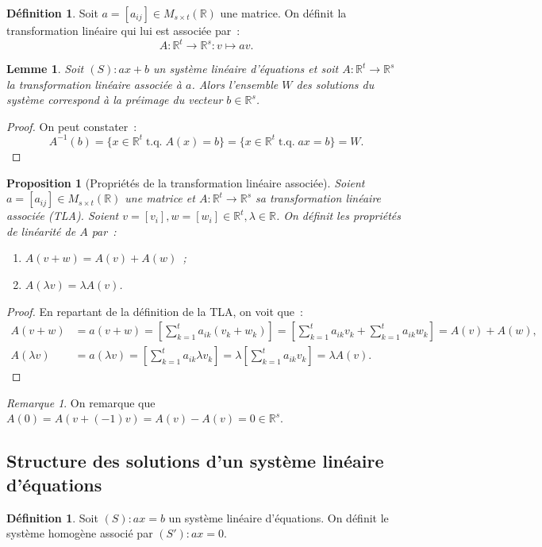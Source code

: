 \documentclass{article}
\DeclareMathOperator{\tq}{\text{ t.q. }}
\newcommand{\R}{\mathbb R}
\newcommand{\M}[3]{M_{#1 \times #2}(#3)}
\newtheorem{prp}[thm]{Proposition}
\newtheorem{lem}[thm]{Lemme}
\theoremstyle{definition}
\newtheorem{déf}[thm]{Définition}
\theoremstyle{remark}
\newtheorem*{rmq}{Remarque}
\begin{document}
		\begin{déf} Soit $a = [a_{ij}] \in \M st\R$ une matrice. On définit la transformation linéaire qui lui est associée par~:
		\[A : \R^t \to \R^s : v \mapsto av.\] \end{déf}

		\begin{lem} Soit $(S) : ax + b$ un système linéaire d'équations et soit $A : \R^t \to \R^s$ la transformation linéaire associée à $a$. Alors l'ensemble $W$ des
		solutions du système correspond à la préimage du vecteur $b \in \R^s$. \end{lem}
		
		\begin{proof} On peut constater~: \[A^{-1}(b) = \{x \in \R^t \tq A(x) = b\} = \{x \in \R^t \tq ax = b\} = W.\] \end{proof}

		\begin{prp}[Propriétés de la transformation linéaire associée] Soient $a = [a_{ij}] \in \M st\R$ une matrice et $A : \R^t \to \R^s$ sa transformation
		linéaire associée (TLA). Soient $v = [v_i], w = [w_i] \in \R^t, \lambda \in \R$. On définit les propriétés de linéarité de $A$ par~:
		\begin{enumerate}
			\item $A(v+w) = A(v) + A(w)$~;
			\item $A(\lambda v) = \lambda A(v)$.
		\end{enumerate}
		\end{prp}

		\begin{proof} En repartant de la définition de la TLA, on voit que~:
		\begin{align*}
			A(v+w) &= a(v+w) = \left[\sum_{k=1}^ta_{ik}(v_k+w_k)\right] = \left[\sum_{k=1}^ta_{ik}v_k+\sum_{k=1}^ta_{ik}w_k\right] = A(v) + A(w), \\
			A(\lambda v) &= a(\lambda v) = \left[\sum_{k=1}^ta_{ik}\lambda v_k\right] = \lambda \left[\sum_{k=1}^ta_{ik}v_k\right] = \lambda A(v).
		\end{align*}
		\end{proof}

		\begin{rmq} On remarque que $A(0) = A(v + (-1)v) = A(v) - A(v) = 0 \in \R^s$. \end{rmq}
	
	\subsection{Structure des solutions d'un système linéaire d'équations}
		\begin{déf} Soit $(S) : ax = b$ un système linéaire d'équations. On définit le système homogène associé par $(S') : ax = 0$. \end{déf}
\end{document}
